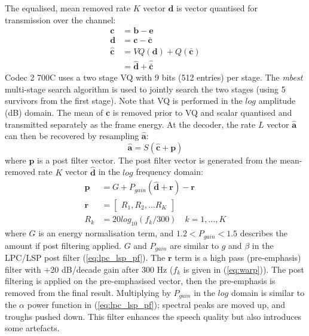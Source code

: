 \documentclass{article}
\begin{document}
The equalised, mean removed rate $K$ vector $\mathbf{d}$ is vector quantised for transmission over the channel:
\begin{equation}
\begin{split}
\mathbf{c} &= \mathbf{b} - \mathbf{e} \\
\mathbf{d} &= \mathbf{c} - \bar{\mathbf{c}} \\
\hat{\mathbf{c}} &= VQ(\mathbf{d}) + Q(\bar{\mathbf{c}}) \\
                 &= \hat{\mathbf{d}} + \hat{\bar{\mathbf{c}}}
\end{split}
\end{equation}
Codec 2 700C uses a two stage VQ with 9 bits (512 entries) per stage. The \emph{mbest} multi-stage search algorithm is used to jointly search the two stages (using 5 survivors from the first stage).  Note that VQ is performed in the $log$ amplitude (dB) domain. The mean of $\mathbf{c}$ is removed prior to VQ and scalar quantised and transmitted separately as the frame energy. At the decoder, the rate $L$ vector $\hat{\mathbf{a}}$ can then be recovered by resampling $\mathbf{\hat{a}}$:
\begin{equation}
\hat{\mathbf{a}} = S(\hat{\mathbf{c}} + \mathbf{p})
\end{equation}
where $\mathbf{p}$ is a post filter vector. The post filter vector is generated from the mean-removed rate $K$ vector $\hat{\mathbf{d}}$ in the $log$ frequency domain:
\begin{equation}
\begin{split}
\mathbf{p} &= G + P_{gain} \left( \hat{\mathbf{d}} + \mathbf{r} \right) - \mathbf{r} \\
\mathbf{r} &= \begin{bmatrix} R_1, R_2, \ldots R_K \end{bmatrix} \\
       R_k &= 20log_{10}(f_k/300) \quad k=1,...,K 
\end{split}
\end{equation}
where $G$ is an energy normalisation term, and $1.2 < P_{gain} < 1.5$ describes the amount if post filtering applied.  $G$ and $P_{gain}$ are similar to $g$ and $\beta$ in the LPC/LSP post filter (\ref{eq:lpc_lsp_pf}).  The $\mathbf{r}$ term is a high pass (pre-emphasis) filter with +20 dB/decade gain after 300 Hz ($f_k$ is given in (\ref{eq:warp})).  The post filtering is applied on the pre-emphasised vector, then the pre-emphasis is removed from the final result.  Multiplying by $P_{gain}$ in the $log$ domain is similar to the $\alpha$ power function in (\ref{eq:lpc_lsp_pf}); spectral peaks are moved up, and troughs pushed down.  This filter enhances the speech quality but also introduces some artefacts.
\end{document}
